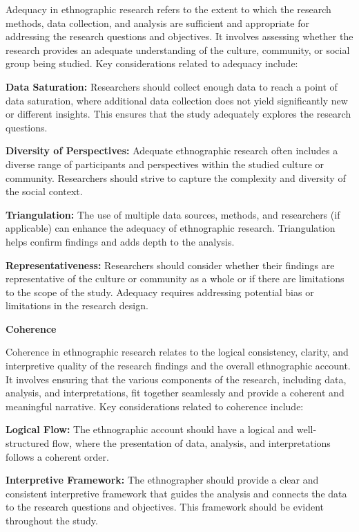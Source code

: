 \documentclass[
  b5paper]{book}
\begin{document}
Adequacy in ethnographic research refers to the extent to which the research methods, data collection, and analysis are sufficient and appropriate for addressing the research questions and objectives. It involves assessing whether the research provides an adequate understanding of the culture, community, or social group being studied. Key considerations related to adequacy include:

\textbf{Data Saturation:} Researchers should collect enough data to reach a point of data saturation, where additional data collection does not yield significantly new or different insights. This ensures that the study adequately explores the research questions.

\textbf{Diversity of Perspectives:} Adequate ethnographic research often includes a diverse range of participants and perspectives within the studied culture or community. Researchers should strive to capture the complexity and diversity of the social context.

\textbf{Triangulation:} The use of multiple data sources, methods, and researchers (if applicable) can enhance the adequacy of ethnographic research. Triangulation helps confirm findings and adds depth to the analysis.

\textbf{Representativeness:} Researchers should consider whether their findings are representative of the culture or community as a whole or if there are limitations to the scope of the study. Adequacy requires addressing potential bias or limitations in the research design.

\textbf{Coherence}

Coherence in ethnographic research relates to the logical consistency, clarity, and interpretive quality of the research findings and the overall ethnographic account. It involves ensuring that the various components of the research, including data, analysis, and interpretations, fit together seamlessly and provide a coherent and meaningful narrative. Key considerations related to coherence include:

\textbf{Logical Flow:} The ethnographic account should have a logical and well-structured flow, where the presentation of data, analysis, and interpretations follows a coherent order.

\textbf{Interpretive Framework:} The ethnographer should provide a clear and consistent interpretive framework that guides the analysis and connects the data to the research questions and objectives. This framework should be evident throughout the study.
\end{document}
